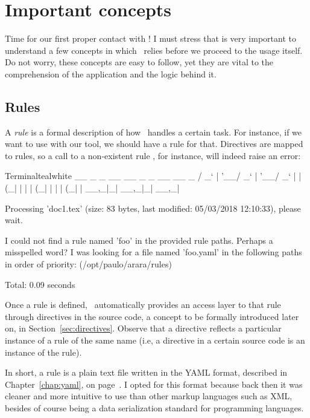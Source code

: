 \chapter{Important concepts}
\label{chap:importantconcepts}

Time for our first proper contact with \arara! I must stress that is very important to understand a few concepts in which \arara\ relies before we proceed to the usage itself. Do not worry, these concepts are easy to follow, yet they are vital to the comprehension of the application and the logic behind it.

\section{Rules}
\label{sec:rule}

A \emph{rule} is a formal description of how \arara\ handles a certain task. For instance, if we want to use  with our tool, we should have a rule for that. Directives are mapped to rules, so a call to a non-existent rule , for instance, will indeed raise an error:

\begin{codebox}{Terminal}{teal}{\icnote}{white}
  __ _ _ __ __ _ _ __ __ _ 
 / _` | '__/ _` | '__/ _` |
| (_| | | | (_| | | | (_| |
 \__,_|_|  \__,_|_|  \__,_|

Processing 'doc1.tex' (size: 83 bytes, last modified: 05/03/2018
12:10:33), please wait.

I could not find a rule named 'foo' in the provided rule paths.
Perhaps a misspelled word? I was looking for a file named
'foo.yaml' in the following paths in order of priority:
(/opt/paulo/arara/rules)

Total: 0.09 seconds
\end{codebox}

Once a rule is defined, \arara\ automatically provides an access layer to that rule through directives in the source code, a concept to be formally introduced later on, in Section~\ref{sec:directives}. Observe that a directive reflects a particular instance of a rule of the same name (i.e, a  directive in a certain source code is an instance of the  rule).

In short, a rule is a plain text file written in the \gls{YAML} format, described in Chapter~\ref{chap:yaml}, on page~\pageref{chap:yaml}. I opted for this format because back then it was cleaner and more intuitive to use than other markup languages such as XML, besides of course being a data serialization standard for programming languages.

